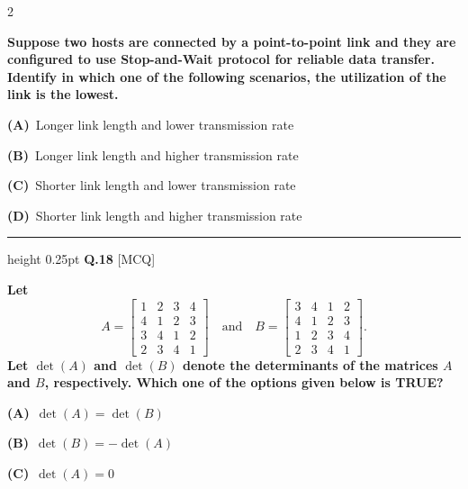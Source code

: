 \documentclass[a4paper,10pt,twoside]{article}
\begin{document}
\begin{multicols}{2}
{\bfseries Suppose two hosts are connected by a point-to-point link and they are configured to use Stop-and-Wait protocol for reliable data transfer. Identify in which one of the following scenarios, the utilization of the link is the lowest. \par}
\par\vspace{2pt}\noindent
\textbf{(A)}~Longer link length and lower transmission rate\par\vspace{2pt}\noindent
\textbf{(B)}~Longer link length and higher transmission rate\par\vspace{2pt}\noindent
\textbf{(C)}~Shorter link length and lower transmission rate\par\vspace{2pt}\noindent
\textbf{(D)}~Shorter link length and higher transmission rate
\par\vspace{6pt}\hrule height 0.25pt\vspace{6pt}
\noindent\textbf{Q.18} \hfill {\footnotesize\textsf{[MCQ]}}
\par\vspace{2pt}
{\bfseries Let
\[ A = \begin{bmatrix} 1 & 2 & 3 & 4 \\ 4 & 1 & 2 & 3 \\ 3 & 4 & 1 & 2 \\ 2 & 3 & 4 & 1 \end{bmatrix} \quad \text{and} \quad B = \begin{bmatrix} 3 & 4 & 1 & 2 \\ 4 & 1 & 2 & 3 \\ 1 & 2 & 3 & 4 \\ 2 & 3 & 4 & 1 \end{bmatrix}. \]
Let $\det(A)$ and $\det(B)$ denote the determinants of the matrices $A$ and $B$, respectively.
Which one of the options given below is TRUE? \par}
\par\vspace{2pt}\noindent
\textbf{(A)}~$\det(A) = \det(B)$\par\vspace{2pt}\noindent
\textbf{(B)}~$\det(B) = -\det(A)$\par\vspace{2pt}\noindent
\textbf{(C)}~$\det(A) = 0$\par\vspace{2pt}\noindent

\end{multicols}
\end{document}
